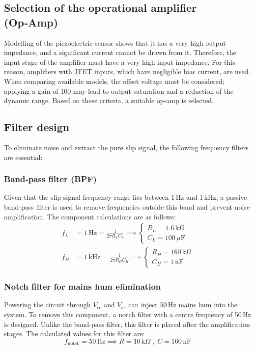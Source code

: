\documentclass[12pt,a4paper]{article}
\begin{document}
\subsection{Selection of the operational amplifier (Op‑Amp)}
Modelling of the piezoelectric sensor shows that it has a very high output impedance, and a significant current cannot be drawn from it. Therefore, the input stage of the amplifier must have a very high input impedance. For this reason, amplifiers with JFET inputs, which have negligible bias current, are used.
When comparing available models, the offset voltage must be considered; applying a gain of 100 may lead to output saturation and a reduction of the dynamic range. Based on these criteria, a suitable op‑amp is selected.

\subsection{Filter design}
To eliminate noise and extract the pure slip signal, the following frequency filters are essential:

\subsubsection{Band‑pass filter (BPF)}
Given that the slip signal frequency range lies between $1 \, \text{Hz}$ and $1 \, \text{kHz}$, a passive band‑pass filter is used to remove frequencies outside this band and prevent noise amplification. The component calculations are as follows:
\begin{align}
    f_L &= 1 \, \text{Hz} = \frac{1}{2\pi R_L C_L} \implies
    \begin{cases}
    R_L = 1.6 \, \text{k}\Omega \\
    C_L = 100 \, \mu\text{F}
    \end{cases} \\[10pt]
    f_H &= 1 \, \text{kHz} = \frac{1}{2\pi R_H C_H} \implies
    \begin{cases}
    R_H = 160 \, \text{k}\Omega \\
    C_H = 1 \, \text{nF}
    \end{cases}
\end{align}

\subsubsection{Notch filter for mains hum elimination}
Powering the circuit through $V_{cc}$ and $V_{ee}$ can inject 50 Hz mains hum into the system. To remove this component, a notch filter with a centre frequency of 50 Hz is designed. Unlike the band‑pass filter, this filter is placed after the amplification stages. The calculated values for this filter are:
\begin{equation}
    f_{\text{notch}} = 50 \, \text{Hz} \implies R = 10 \, \text{k}\Omega \; , \; C = 160 \, \text{nF}
\end{equation}
\end{document}
